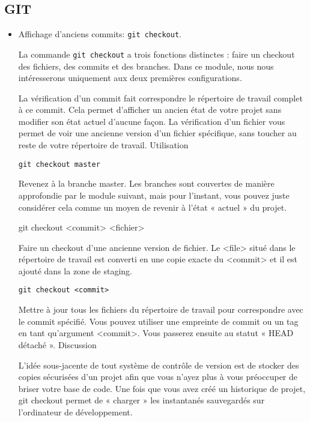 \subsection{GIT}

\begin{itemize}

\item Affichage d'anciens commits: \verb=git checkout=.

La commande \verb=git checkout= a trois fonctions distinctes : faire un checkout des fichiers, des commits et des branches. Dans ce module, nous nous intéresserons uniquement aux deux premières configurations.

La vérification d'un commit fait correspondre le répertoire de travail complet à ce commit. Cela permet d'afficher un ancien état de votre projet sans modifier son état actuel d'aucune façon. La vérification d'un fichier vous permet de voir une ancienne version d'un fichier spécifique, sans toucher au reste de votre répertoire de travail.
Utilisation

\begin{verbatim}
git checkout master
\end{verbatim}

Revenez à la branche master. Les branches sont couvertes de manière approfondie par le module suivant, mais pour l'instant, vous pouvez juste considérer cela comme un moyen de revenir à l'état « actuel » du projet.


git checkout <commit> <fichier>

Faire un checkout d'une ancienne version de fichier. Le <file> situé dans le répertoire de travail est converti en une copie exacte du <commit> et il est ajouté dans la zone de staging.

\begin{verbatim}
git checkout <commit>
\end{verbatim}

Mettre à jour tous les fichiers du répertoire de travail pour correspondre avec le commit spécifié. Vous pouvez utiliser une empreinte de commit ou un tag en tant qu'argument <commit>. Vous passerez ensuite au statut « HEAD détaché ».
Discussion

L'idée sous-jacente de tout système de contrôle de version est de stocker des copies sécurisées d'un projet afin que vous n'ayez plus à vous préoccuper de briser votre base de code. Une fois que vous avez créé un historique de projet, git checkout permet de « charger » les instantanés sauvegardés sur l'ordinateur de développement.


\end{itemize}
